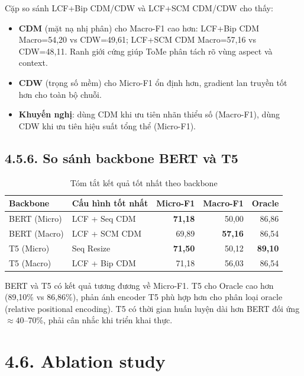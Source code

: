 Cặp so sánh LCF+Bip CDM/CDW và LCF+SCM CDM/CDW cho thấy:
\begin{itemize}
  \item \textbf{CDM} (mặt nạ nhị phân) cho Macro-F1 cao hơn: LCF+Bip CDM
        Macro=54,20 vs CDW=49,61; LCF+SCM CDM Macro=57,16 vs CDW=48,11.
        Ranh giới cứng giúp ToMe phân tách rõ vùng aspect và context.
  \item \textbf{CDW} (trọng số mềm) cho Micro-F1 ổn định hơn, gradient
        lan truyền tốt hơn cho toàn bộ chuỗi.
  \item \textbf{Khuyến nghị}: dùng CDM khi ưu tiên nhãn thiểu số
        (Macro-F1), dùng CDW khi ưu tiên hiệu suất tổng thể (Micro-F1).
\end{itemize}

\subsection{4.5.6.\; So sánh backbone BERT và T5}

\begin{table}[H]
\centering
\small
\caption{Tóm tắt kết quả tốt nhất theo backbone}
\label{tab:backbone_summary}
\begin{tabular}{@{}llrrr@{}}
\toprule
\textbf{Backbone} & \textbf{Cấu hình tốt nhất} & \textbf{Micro-F1} & \textbf{Macro-F1} & \textbf{Oracle} \\
\midrule
BERT (Micro) & LCF + Seq CDM & \textbf{71,18} & 50,00 & 86,86 \\
BERT (Macro) & LCF + SCM CDM & 69,89 & \textbf{57,16} & 86,54 \\
T5 (Micro)   & Seq Resize     & \textbf{71,50} & 50,12 & \textbf{89,10} \\
T5 (Macro)   & LCF + Bip CDM  & 71,18 & 56,03 & 86,54 \\
\bottomrule
\end{tabular}
\end{table}

BERT và T5 có kết quả tương đương về Micro-F1. T5 cho Oracle cao hơn
(89,10\% vs 86,86\%), phản ánh encoder T5 phù hợp hơn cho phân loại
oracle (relative positional encoding). T5 có thời gian huấn luyện dài
hơn BERT đối ứng $\approx40$--70\%, phải cân nhắc khi triển khai thực.

\section{4.6.\; Ablation study}
\label{sec:ablation}

